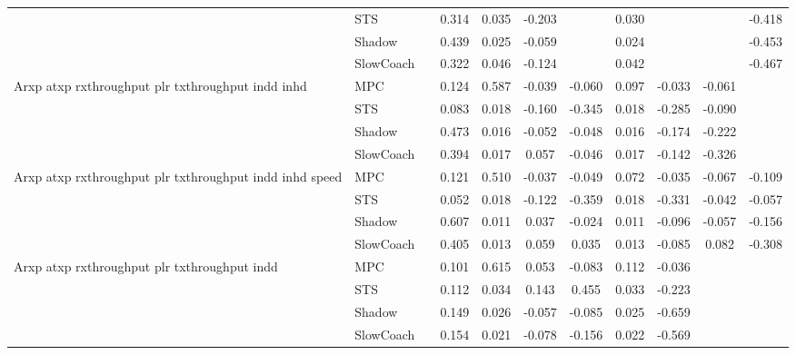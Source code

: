 \begin{tabular}{|l|l|*{9}{c|}}
                              & STS &       &     0.314 &     0.035 & -0.203 &     &  0.030 &      &      &   -0.418 \\
                              & Shadow &       &     0.439 &     0.025 & -0.059 &     &  0.024 &      &      &   -0.453 \\
                              & SlowCoach &       &     0.322 &     0.046 & -0.124 &     &  0.042 &      &      &   -0.467 \\
\midrule
Arxp atxp rxthroughput plr txthroughput indd inhd    & MPC &       &     0.124 &     0.587 & -0.039 & -0.060 &  0.097 &  -0.033 &  -0.061 &       \\
                              & STS &       &     0.083 &     0.018 & -0.160 & -0.345 &  0.018 &  -0.285 &  -0.090 &       \\
                              & Shadow &       &     0.473 &     0.016 & -0.052 & -0.048 &  0.016 &  -0.174 &  -0.222 &       \\
                              & SlowCoach &       &     0.394 &     0.017 &  0.057 & -0.046 &  0.017 &  -0.142 &  -0.326 &       \\
\midrule
Arxp atxp rxthroughput plr txthroughput indd inhd speed    & MPC &       &     0.121 &     0.510 & -0.037 & -0.049 &  0.072 &  -0.035 &  -0.067 &   -0.109 \\
                              & STS &       &     0.052 &     0.018 & -0.122 & -0.359 &  0.018 &  -0.331 &  -0.042 &   -0.057 \\
                              & Shadow &       &     0.607 &     0.011 &  0.037 & -0.024 &  0.011 &  -0.096 &  -0.057 &   -0.156 \\
                              & SlowCoach &       &     0.405 &     0.013 &  0.059 &  0.035 &  0.013 &  -0.085 &   0.082 &   -0.308 \\
\midrule
Arxp atxp rxthroughput plr txthroughput indd    & MPC &       &     0.101 &     0.615 &  0.053 & -0.083 &  0.112 &  -0.036 &      &       \\
                              & STS &       &     0.112 &     0.034 &  0.143 &  0.455 &  0.033 &  -0.223 &      &       \\
                              & Shadow &       &     0.149 &     0.026 & -0.057 & -0.085 &  0.025 &  -0.659 &      &       \\
                              & SlowCoach &       &     0.154 &     0.021 & -0.078 & -0.156 &  0.022 &  -0.569 &      &       \\

\end{tabular}
